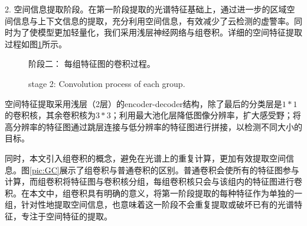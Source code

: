 \documentclass[10pt]{ctexart}
\begin{document}
\begin{multicols}{2}
2. 空间信息提取阶段。在第一阶段提取的光谱特征基础上，通过进一步的区域空间信息与上下文信息的提取，充分利用空间信息，有效减少了云检测的虚警率。同时为了使模型更加轻量化，我们采用浅层神经网络与组卷积。详细的空间特征提取过程如图\ref{pic:part2}所示。
\begin{figure}[H]
    \centering
    \caption[]{阶段二： 每组特征图的卷积过程。}
    \addtocounter{figure}{-1}
    \vspace{-5pt}
    \renewcommand{\figurename}{Fig}
    \caption{stage 2: Convolution process of each group.}
    \renewcommand{\figurename}{图}
    \label{pic:part2}
\end{figure}

空间特征提取采用浅层（2层）的encoder-decoder结构，除了最后的分类层是$1*1$的卷积核，其余卷积核为$3*3$；利用最大池化层降低图像分辨率，扩大感受野；将高分辨率的特征图通过跳层连接与低分辨率的特征图进行拼接，以检测不同大小的目标。

同时，本文引入组卷积的概念，避免在光谱上的重复计算，更加有效提取空间信息。图\ref{pic:GC}展示了组卷积与普通卷积的区别。普通卷积会使所有的特征图参与计算，而组卷积将特征图与卷积核分组，每组卷积核只会与该组内的特征图进行卷积。在本文中，组卷积具有明确的意义，将第一阶段提取的每种特征作为单独的一组，针对性地提取空间信息，也意味着这一阶段不会重复提取或破坏已有的光谱特征，专注于空间特征的提取。


\end{multicols}
\end{document}
